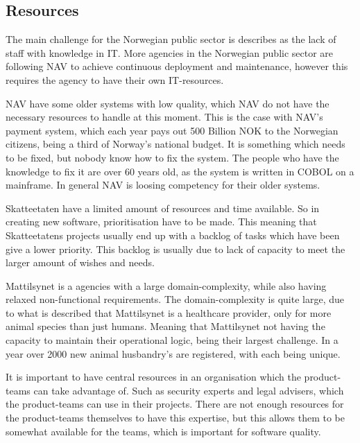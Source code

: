 \subsection{Resources}
The main challenge for the Norwegian public sector is describes as the lack of staff with knowledge in IT. More agencies in the Norwegian public sector are following NAV to achieve continuous deployment and maintenance, however this requires the agency to have their own IT-resources.

NAV have some older systems with low quality, which NAV do not have the necessary resources to handle at this moment. This is the case with NAV's payment system, which each year pays out 500 Billion NOK to the Norwegian citizens, being a third of Norway's national budget. It is something which needs to be fixed, but nobody know how to fix the system. The people who have the knowledge to fix it are over 60 years old, as the system is written in COBOL on a mainframe. In general NAV is loosing competency for their older systems.

Skatteetaten have a limited amount of resources and time available. So in creating new software, prioritisation have to be made. This meaning that Skatteetatens projects usually end up with a backlog of tasks which have been give a lower priority. This backlog is usually due to lack of capacity to meet the larger amount of wishes and needs.

Mattilsynet is a agencies with a large domain-complexity, while also having relaxed non-functional requirements. The domain-complexity is quite large, due to what is described that Mattilsynet is a healthcare provider, only for more animal species than just humans. Meaning that Mattilsynet not having the capacity to maintain their operational logic, being their largest challenge. In a year over 2000 new animal husbandry's are registered, with each being unique.  

It is important to have central resources in an organisation which the product-teams can take advantage of. Such as security experts and legal advisers, which the product-teams can use in their projects. There are not enough resources for the product-teams themselves to have this expertise, but this allows them to be somewhat available for the teams, which is important for software quality.



